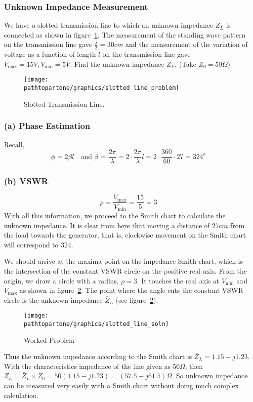 \begin{exmp}
\subsubsection*{Unknown Impedance Measurement}
We have a slotted transmission line to which an unknown impedance $Z_L$ is connected as shown in figure~\ref{fig:fig3}. The measurement of the standing wave pattern on the transmission line gave $\frac{\lambda}{2}=30cm$ and the measurement of the variation of voltage as a function of length $l$ on the transmission line gave $V_\max=15V, V_\min=5V$. Find the unknown impedance $Z_L$. (Take $Z_0 = 50\varOmega$)
\begin{figure}[h]
\centering
\texttt{[image: \\pathtopartone/graphics/slotted\_line\_problem]}
\caption{Slotted Transmission Line.}
\label{fig:fig3}
\end{figure}

\subsubsection*{(a) Phase Estimation}
Recall,
\begin{dmath*}
\phi=2\beta l\quad\text{and }\beta\text{ = }\dfrac{2\pi}{\lambda}
=2\cdot\dfrac{2\pi}{\lambda} l
=2\cdot\dfrac{360}{60}\cdot27
=324^{o}
\end{dmath*}
\subsubsection*{(b) VSWR}
\begin{equation*}
\rho=\frac{V_\max}{V_\min}=\frac{15}{5}=3
\end{equation*}
With all this information, we proceed to the Smith chart to calculate the unknown impedance. It is clear from here that moving a distance of $27cm$ from the load towards the generator, that is, clockwise movement on the Smith chart will correspond to 324\textdegree.

We should arrive at the maxima point on the impedance Smith chart, which is the intersection of the constant VSWR circle on the positive real axis. From the origin, we draw a circle with a radius, $\rho = 3$. It touches the real axis at $V_\min$ and $V_\max$ as shown in figure~\ref{fig:slottedlinesoln}. The point where the angle cuts the constant VSWR circle is the unknown impedance $\bar{Z}_L$ (see figure~\ref{fig:slottedlinesoln}).
\begin{figure}
\centering
\texttt{[image: \\pathtopartone/graphics/slotted\_line\_soln]}
\caption{Worked Problem}
\label{fig:slottedlinesoln}
\end{figure}

Thus the unknown impedance according to the Smith chart is $\bar{Z}_L=1.15-j1.23$. With the characteristics impedance of the line given as $50\varOmega$, then $Z_{L}=\bar{Z}_L\times Z_0 =50(1.15-j1.23)= (57.5-j61.5) \varOmega$. So unknown impedance can be measured very easily with a Smith chart without doing much complex calculation.
\end{exmp}


